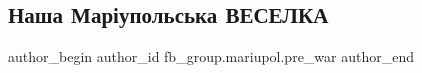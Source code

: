  
 
 
 
 

\subsection{Наша Маріупольська ВЕСЕЛКА}
\label{sec:11_02_2023.fb.fb_group.mariupol.pre_war.6.nasha_mar_upolska_ve}

\ifcmt
 author_begin
   author_id fb_group.mariupol.pre_war
 author_end
\fi
